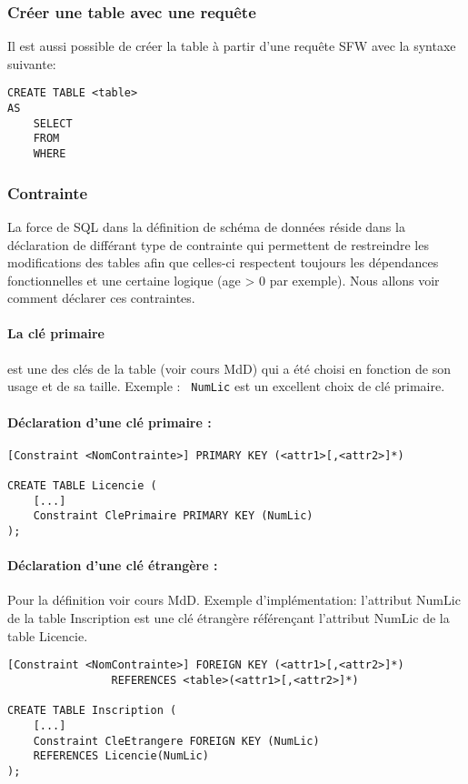 \documentclass[10pt,a4paper,twoside]{article}
\begin{document}
\subsubsection{Créer une table avec une requête} 
Il est aussi possible de créer la table à partir d'une requête SFW avec la syntaxe suivante:
\begin{verbatim}
CREATE TABLE <table>
AS
    SELECT
    FROM
    WHERE
\end{verbatim}


\subsubsection{Contrainte} 
La force de SQL dans la définition de schéma de données réside dans la déclaration de différant type de contrainte qui permettent de restreindre les modifications des tables afin que celles-ci respectent toujours les dépendances fonctionnelles et une certaine logique (age > 0 par exemple). Nous allons voir comment déclarer ces contraintes.

\paragraph{La clé primaire} est une des clés de la table (voir cours MdD) qui a été choisi en fonction de son usage et de sa taille. Exemple : \verb= NumLic= est un excellent choix de clé primaire.

\paragraph{Déclaration d'une clé primaire :} 
\begin{verbatim}
[Constraint <NomContrainte>] PRIMARY KEY (<attr1>[,<attr2>]*)

CREATE TABLE Licencie (
    [...]
    Constraint ClePrimaire PRIMARY KEY (NumLic)
);
\end{verbatim}

\paragraph{Déclaration d'une clé étrangère :} Pour la définition voir cours MdD. Exemple d'implémentation: l'attribut NumLic de la table Inscription est une clé étrangère référençant l'attribut NumLic de la table Licencie.
\begin{verbatim}
[Constraint <NomContrainte>] FOREIGN KEY (<attr1>[,<attr2>]*)
                REFERENCES <table>(<attr1>[,<attr2>]*)

CREATE TABLE Inscription (
    [...]
    Constraint CleEtrangere FOREIGN KEY (NumLic) 
    REFERENCES Licencie(NumLic)
);
\end{verbatim}
\end{document}
